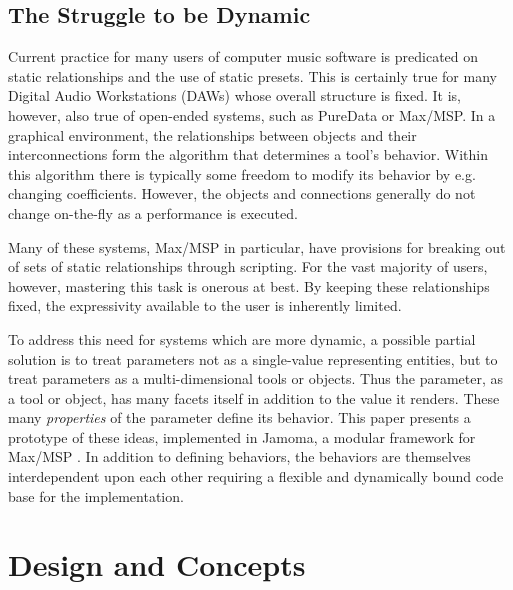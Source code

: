 \documentclass{article}
\begin{document}
\subsection{The Struggle to be Dynamic} %

Current practice for many users of computer music software is predicated on static relationships and the use of static presets. This is certainly true for many Digital Audio Workstations (DAWs) whose overall structure is fixed. It is, however, also true of open-ended systems, such as PureData or Max/MSP. In a graphical environment, the relationships between objects and their interconnections form the algorithm that determines a tool's behavior. Within this algorithm there is typically some freedom to modify its behavior by e.g. changing coefficients. However, the objects and connections generally do not change on-the-fly as a performance is executed.

Many of these systems, Max/MSP in particular, have provisions for breaking out of sets of static relationships through scripting. For the vast majority of users, however, mastering this task is onerous at best. By keeping these relationships fixed, the expressivity available to the user is inherently limited. 

To address this need for systems which are more dynamic, a possible partial solution is to treat parameters not as a single-value representing entities, but to treat parameters as a multi-dimensional tools or objects.  Thus the parameter, as a tool or object, has many facets itself in addition to the value it renders.  These many \emph{properties} of the parameter define its behavior. This paper presents a prototype of these ideas, implemented in Jamoma, a modular framework for Max/MSP \cite{Place:2006}. In addition to defining behaviors, the behaviors are themselves interdependent upon each other requiring a flexible and dynamically bound code base for the implementation.




\section{Design and Concepts} %
\label{sec:design_and_concepts}
\end{document}
